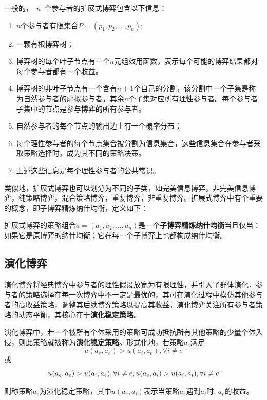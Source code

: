 \begin{definition}
一般的，~$n$~个参与者的扩展式博弈包含以下信息：
\begin{enumerate}
	\item $n$个参与者有限集合$P=(p_1,p_2,...,p_n)$;
	\item 一颗有根博弈树；
	\item 博弈树的每个叶子节点有一个$n$元组效用函数，表示每个可能的博弈结果都对每个参与者都有一个收益。
	\item 博弈树的非叶子节点有一个含有$n+1$个自己的分割，该分割中一个子集是称为自然参与者的虚拟参与者，其余$n$个子集对应所有理性参与者。每个参与者子集中的节点是参与博弈的所有参与者。
	
	\item 自然参与者的每个节点的输出边上有一个概率分布；
	\item 每个理性参与者的每个节点集合被分割为信息集合，这些信息集合在参与者采取策略选择时，成为其不同的策略决策。
	\item 上述这些信息是每个理性参与者的公共常识。
\end{enumerate}
\end{definition}

类似地，扩展式博弈也可以划分为不同的子类，如完美信息博弈，非完美信息博弈，纯策略博弈，混合策略博弈，重复博弈，非重复博弈。扩展式博弈中有个重要的概念，即子博弈精炼纳什均衡，定义如下：
\begin{definition}
扩展式博弈的策略组合$a=(a_1,a_2,...,a_n)$是一个\textbf{子博弈精炼纳什均衡}当且仅当：如果它是原博弈的纳什均衡；它在每一个子博弈上也都构成纳什均衡。
\end{definition}
\subsection{演化博弈}

演化博弈将经典博弈中参与者的理性假设放宽为有限理性，并引入了群体演化．参与者的策略选择在每一次博弈中不一定是最优的，其可在演化过程中模仿其他参与者的高收益策略，调整其后续博弈策略以提高其收益。演化博弈关注所有参与者策略的动态平衡，其核心在于\textbf{演化稳定策略}。

\begin{definition}
	演化博弈中，若一个被所有个体采用的策略可成功抵抗所有其他策略的少量个体入侵，则此策略就被称为\textbf{演化稳定策略}。形式化地，若策略$a_e$满足
	\begin{equation}
	u(a_e,a_e) > u(a_i,a_e), \forall i \ne e 
	\end{equation}
	或
	\begin{equation}
	u(a_e,a_e) > u(a_i,a_e), \forall i \ne e,\\
	u(a_e,a_i) > u(a_i,a_i), \forall i \ne e 
	\end{equation}
	
	则称策略$a_e$为演化稳定策略，其中$u(a_e,a_i)$表示当策略$a_e$遇到$a_i$时, $a_e$的收益。
	
\end{definition}


